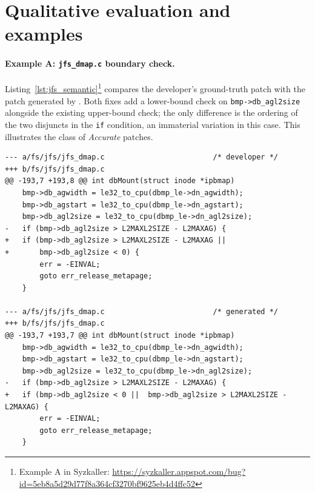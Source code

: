 \section{Qualitative evaluation and examples}
\label{app:qualexamples}

\paragraph{Example A: \texttt{jfs\_dmap.c} boundary check.}
Listing~\ref{lst:jfs_semantic}\footnote{Example A in Syzkaller: \url{https://syzkaller.appspot.com/bug?id=5eb8a5d29d77f8a364cf3270bf9625eb4d4ffc52}}   compares the developer’s ground-truth patch  with
the patch generated by \cresearcher{}.  Both fixes add a
lower-bound check on \verb|bmp->db_agl2size| alongside the existing upper-bound
check; the only difference is the ordering of the two disjuncts in the \texttt{if}
condition, an immaterial variation in this case.
This illustrates the class of \emph{Accurate} patches.


\begin{code}
\label{lst:jfs_semantic}
\begin{verbatim}
--- a/fs/jfs/jfs_dmap.c                         /* developer */
+++ b/fs/jfs/jfs_dmap.c
@@ -193,7 +193,8 @@ int dbMount(struct inode *ipbmap)
    bmp->db_agwidth = le32_to_cpu(dbmp_le->dn_agwidth);
    bmp->db_agstart = le32_to_cpu(dbmp_le->dn_agstart);
    bmp->db_agl2size = le32_to_cpu(dbmp_le->dn_agl2size);
-   if (bmp->db_agl2size > L2MAXL2SIZE - L2MAXAG) {
+   if (bmp->db_agl2size > L2MAXL2SIZE - L2MAXAG ||
+       bmp->db_agl2size < 0) {
        err = -EINVAL;
        goto err_release_metapage;
    }

--- a/fs/jfs/jfs_dmap.c                         /* generated */
+++ b/fs/jfs/jfs_dmap.c
@@ -193,7 +193,7 @@ int dbMount(struct inode *ipbmap)
    bmp->db_agwidth = le32_to_cpu(dbmp_le->dn_agwidth);
    bmp->db_agstart = le32_to_cpu(dbmp_le->dn_agstart);
    bmp->db_agl2size = le32_to_cpu(dbmp_le->dn_agl2size);
-   if (bmp->db_agl2size > L2MAXL2SIZE - L2MAXAG) {
+   if (bmp->db_agl2size < 0 ||  bmp->db_agl2size > L2MAXL2SIZE - L2MAXAG) {
        err = -EINVAL;
        goto err_release_metapage;
    }
\end{verbatim}
\end{code}


